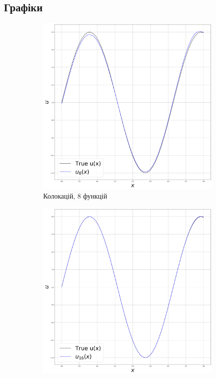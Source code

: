 \subsection{Графіки}
\begin{figure}[H]
    \begin{subfigure}{.5\textwidth}
    \centering
    \includegraphics[width=.95\linewidth]{collocation_8.png}
    \caption{Колокацій, 8 функцій}
    \end{subfigure}
    \hfill
    \begin{subfigure}{.5\textwidth}
    \centering
    \includegraphics[width=.95\linewidth]{collocation_16.png}

\end{subfigure}
\end{figure}
